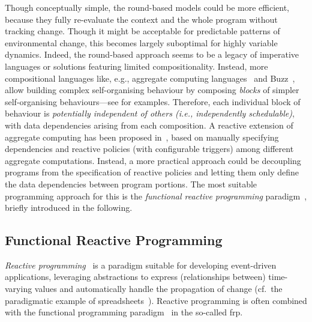Though conceptually simple,
 the round-based models could be more efficient,
 because they fully re-evaluate the context
 and the whole program
 without tracking change.
%
Though it might be acceptable for predictable patterns of environmental change,
  this becomes largely suboptimal for highly variable dynamics.
%
Indeed,
the round-based approach seems to be a legacy of imperative languages or solutions featuring limited compositionality.
Instead, more compositional languages like, e.g., aggregate computing languages~\cite{vbdacp:ac:survey:jlamp,DBLP:journals/nca/BachrachBM10,DBLP:conf/ecoop/AudritoCDSV22} and Buzz~\cite{DBLP:conf/iros/PinciroliB16},
 allow building complex self-organising behaviour
 by composing \emph{blocks} of simpler self-organising behaviours---see  for examples.
%
Therefore, each individual block of behaviour 
  is \emph{potentially independent of others (i.e., independently schedulable)},
  with data dependencies arising from each composition.
%
A reactive extension of aggregate computing has been proposed in~\cite{DBLP:journals/lmcs/PianiniCVMZ21},
  based on manually specifying dependencies and reactive policies (with configurable triggers) among different aggregate computations.
%
Instead,
a more practical approach could be
decoupling programs from the specification of reactive policies
and letting them only define the data dependencies between program portions.
%
The most suitable programming approach for this
 is the \emph{functional reactive programming} paradigm~\cite{DBLP:journals/csur/BainomugishaCCMM13}, briefly introduced in the following.
%

\subsection{Functional Reactive Programming}
\label{acsos2023-frp:sec:background:frp}

\emph{Reactive programming}~\cite{DBLP:journals/csur/BainomugishaCCMM13} is a paradigm suitable for developing event-driven applications,
 leveraging abstractions to express (relationships between) time-varying values and 
 automatically handle the propagation of change
(cf.\ the paradigmatic example of spreadsheets~\cite{blackheath2016frp-sodium}).
%
%
Reactive programming is often combined with the functional programming paradigm~\cite{DBLP:journals/csur/BainomugishaCCMM13,blackheath2016frp-sodium}
in the so-called \ac{frp}.

